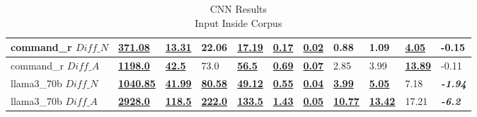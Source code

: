 \documentclass[11pt]{article}
\begin{document}
\begin{table}[ht]
{\begin{tabular}{lllllllllll}
            command\_r $Diff\_N$  & \textbf{\underline{371.08}}  & \textbf{\underline{13.31}}  & 22.06                       & \textbf{\underline{17.19}} & \textbf{\underline{0.17}} & \textbf{\underline{0.02}} & 0.88                       & 1.09                       & \textbf{\underline{4.05}}  & -0.15                   \\ \midrule
            command\_r $Diff\_A$  & \textbf{\underline{1198.0}}  & \textbf{\underline{42.5}}   & 73.0                        & \textbf{\underline{56.5}}  & \textbf{\underline{0.69}} & \textbf{\underline{0.07}} & 2.85                       & 3.99                       & \textbf{\underline{13.89}} & -0.11                   \\ \midrule
            llama3\_70b $Diff\_N$ & \textbf{\underline{1040.85}} & \textbf{\underline{41.99}}  & \textbf{\underline{80.58}}  & \textbf{\underline{49.12}} & \textbf{\underline{0.55}} & \textbf{\underline{0.04}} & \textbf{\underline{3.99}}  & \textbf{\underline{5.05}}  & 7.18                       & \textbf{\textit{-1.94}} \\ \midrule
            llama3\_70b $Diff\_A$ & \textbf{\underline{2928.0}}  & \textbf{\underline{118.5}}  & \textbf{\underline{222.0}}  & \textbf{\underline{133.5}} & \textbf{\underline{1.43}} & \textbf{\underline{0.05}} & \textbf{\underline{10.77}} & \textbf{\underline{13.42}} & 17.21                      & \textbf{\textit{-6.2}}  \\ \bottomrule
        \end{tabular}%
    }
    \caption{CNN Results\\Input Inside Corpus}
    \label{table-prompt-2-ifd-cnn-dailymail}
\end{table}
\end{document}
